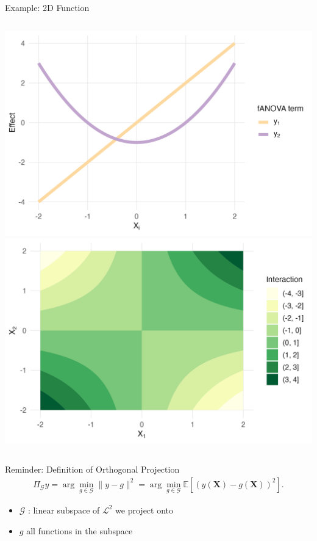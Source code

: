 \begin{frame}{Example: 2D Function} %
  \begin{columns}
      \includegraphics[width=\linewidth]{../images/experiment_section/classical_ex_1_a1p20_a2p00_a11p00_a22p10_a12p10_rhop00_main.png}
      \includegraphics[width=\linewidth]{../images/experiment_section/classical_ex_1_a1p20_a2p00_a11p00_a22p10_a12p10_rhop00_interaction.png}
  \end{columns}
\end{frame}

\begin{frame}{Reminder: Definition of Orthogonal Projection} %
  \begin{align}
    \Pi_{\mathcal{G}}y = \arg\min_{g \in \mathcal{G}} \|y - g\|^2
= \arg\min_{g \in \mathcal{G}} \mathbb{E}[(y(\boldsymbol{X}) - g(\boldsymbol{X}))^2].
\end{align}
  \begin{itemize}
    \item $\mathcal{G}$ : linear subspace of $\mathcal{L}^2$ we project onto
    \item $g$ all functions in the subspace
  \end{itemize}
\end{frame}

